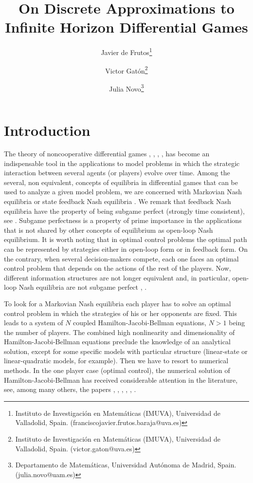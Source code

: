 \documentclass[12pt]{article}
\title{On Discrete Approximations to Infinite Horizon Differential Games
}
\author{ Javier de Frutos\thanks{Instituto de Investigaci\'on en Matem\'aticas (IMUVA), Universidad
de Valladolid, Spain.  (franciscojavier.frutos.baraja@uva.es)}
\and Victor Gat\'{o}n\thanks{Instituto de Investigaci\'on en Matem\'aticas (IMUVA), Universidad
de Valladolid, Spain. (victor.gaton@uva.es)}
  \and Julia Novo\thanks{Departamento de
Matem\'aticas, Universidad Aut\'onoma de Madrid, Spain. (julia.novo@uam.es)}}
\date{}
\newcounter{remark}
\begin{document}
\maketitle
{}

\section{Introduction}

 The theory of noncooperative differential games \cite{Basar}, \cite{Dockner}, \cite{Haurie_et_al}, \cite{Basar_et_al},  has become an indispensable tool in the applications to model problems in which the strategic interaction between several agents (or players) evolve over time. Among the several, non equivalent, concepts of equilibria in differential games that can be used to analyze a given model problem, we are concerned with Markovian Nash equilibria or state feedback Nash equilibria \cite{Basar_et_al}. We remark that feedback Nash equilibria have the property of being subgame perfect (strongly time consistent), see \cite{Basar_et_al}. Subgame perfectness is a property of prime importance in the applications that is not shared by other concepts of equilibrium as open-loop Nash equilibrium. It is worth noting that in  optimal control problems the optimal path can be represented by strategies either in open-loop form or in feedback form. On the contrary, when several decision-makers compete, each one faces an optimal control problem that depends on the actions of the rest of the players. Now, different information structures are not longer equivalent and, in particular, open-loop Nash equilibria are not subgame perfect \cite{Dockner}, \cite{Basar_et_al}.

  To look for a Markovian Nash equilibria each player has to solve an optimal control problem in which the strategies of his or her opponents are fixed. This leads to a system of $N$ coupled Hamilton-Jacobi-Bellman equations, $N>1$ being the number of players.
  {The combined high nonlinearity and dimensionality of Hamilton-Jacobi-Bellman equations preclude the knowledge of an analytical solution, except for some specific models with particular structure (linear-state or linear-quadratic models, for example).}
  Then we have to resort to numerical methods. In the one player case (optimal control), the numerical solution of Hamilton-Jacobi-Bellman has received considerable attention in the literature, see, among many others, the papers \cite{Falcone_Ferreti}, \cite{Falcone}, \cite{carlini}, \cite{Akian}, \cite{Guo}, \cite{Bo_et_al}.
\end{document}
